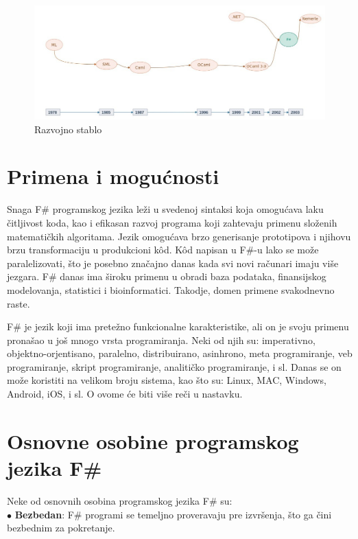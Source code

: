\documentclass[a4paper]{article}
\begin{document}
\begin{figure}[h!]
\begin{center}
\includegraphics[scale=0.255]{stablo.jpg}
\end{center}
\caption{Razvojno stablo}
\label{fig:stablo}
\end{figure}

\section{Primena i mogućnosti}
\label{sec:primena}

Snaga F\# programskog jezika leži u svedenoj sintaksi koja omogućava laku čitljivost koda, kao i efikasan razvoj programa koji zahtevaju primenu složenih matematičkih algoritama. Jezik omogućava brzo generisanje prototipova i njihovu brzu transformaciju u produkcioni kôd. Kôd napisan u F\#-u lako se može paralelizovati, što je posebno značajno danas kada svi novi računari imaju više jezgara. F\# danas ima široku primenu u obradi baza podataka, finansijskog modelovanja, statistici i bioinformatici. Takodje, domen primene svakodnevno raste.

F\# je jezik koji ima pretežno funkcionalne karakteristike, ali on je svoju primenu pronašao u još mnogo vrsta programiranja. Neki od njih su: imperativno, objektno-orjentisano, paralelno, distribuirano, asinhrono, meta programiranje, veb programiranje, skript programiranje, analitičko programiranje, i sl. Danas se on može koristiti na velikom broju sistema, kao što su: Linux, MAC, Windows, Android, iOS, i sl. O ovome će biti više reči u nastavku. 


\section{Osnovne osobine programskog jezika F\#}

Neke od osnovnih osobina programskog jezika F\# su:\\

	$\bullet$ \textbf{Bezbedan}: F\# programi se temeljno proveravaju pre izvršenja, što ga čini bezbednim za pokretanje.
\end{document}
